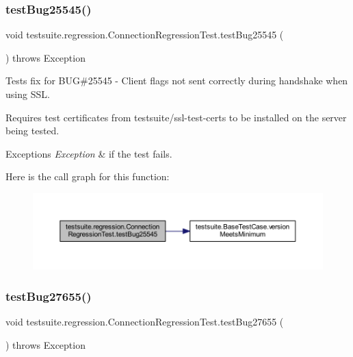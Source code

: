 \subsubsection{\texorpdfstring{test\+Bug25545()}{testBug25545()}}
{\footnotesize\ttfamily void testsuite.\+regression.\+Connection\+Regression\+Test.\+test\+Bug25545 (\begin{DoxyParamCaption}{ }\end{DoxyParamCaption}) throws Exception}

Tests fix for B\+UG\#25545 -\/ Client flags not sent correctly during handshake when using S\+SL.

Requires test certificates from testsuite/ssl-\/test-\/certs to be installed on the server being tested.


\begin{DoxyExceptions}{Exceptions}
{\em Exception} & if the test fails. \\
\hline
\end{DoxyExceptions}
Here is the call graph for this function\+:
\nopagebreak
\begin{figure}[H]
\begin{center}
\leavevmode
\includegraphics[width=350pt]{classtestsuite_1_1regression_1_1_connection_regression_test_a98a44b0432aebd94026747e6fce76282_cgraph}
\end{center}
\end{figure}
\mbox{\label{classtestsuite_1_1regression_1_1_connection_regression_test_a02d58a66068ff4c5f9fa6c77ebf3b50f}} 
\subsubsection{\texorpdfstring{test\+Bug27655()}{testBug27655()}}
{\footnotesize\ttfamily void testsuite.\+regression.\+Connection\+Regression\+Test.\+test\+Bug27655 (\begin{DoxyParamCaption}{ }\end{DoxyParamCaption}) throws Exception}

